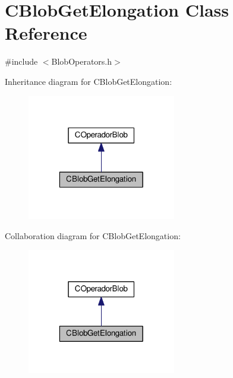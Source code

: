 \hypertarget{classCBlobGetElongation}{\section{C\-Blob\-Get\-Elongation Class Reference}
\label{classCBlobGetElongation}
}


{\ttfamily \#include $<$Blob\-Operators.\-h$>$}



Inheritance diagram for C\-Blob\-Get\-Elongation\-:\nopagebreak
\begin{figure}[H]
\begin{center}
\leavevmode
\includegraphics[width=184pt]{classCBlobGetElongation__inherit__graph}
\end{center}
\end{figure}


Collaboration diagram for C\-Blob\-Get\-Elongation\-:\nopagebreak
\begin{figure}[H]
\begin{center}
\leavevmode
\includegraphics[width=184pt]{classCBlobGetElongation__coll__graph}
\end{center}
\end{figure}
